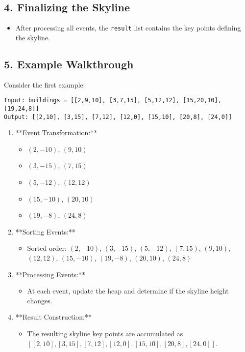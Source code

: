 \subsection*{4. Finalizing the Skyline}

\begin{itemize}
    \item After processing all events, the \texttt{result} list contains the key points defining the skyline.
\end{itemize}

\subsection*{5. Example Walkthrough}

Consider the first example:
\begin{verbatim}
Input: buildings = [[2,9,10], [3,7,15], [5,12,12], [15,20,10], [19,24,8]]
Output: [[2,10], [3,15], [7,12], [12,0], [15,10], [20,8], [24,0]]
\end{verbatim}

\begin{enumerate}
    \item **Event Transformation:**
    \begin{itemize}
        \item \((2, -10)\), \((9, 10)\)
        \item \((3, -15)\), \((7, 15)\)
        \item \((5, -12)\), \((12, 12)\)
        \item \((15, -10)\), \((20, 10)\)
        \item \((19, -8)\), \((24, 8)\)
    \end{itemize}
    
    \item **Sorting Events:**
    \begin{itemize}
        \item Sorted order: \((2, -10)\), \((3, -15)\), \((5, -12)\), \((7, 15)\), \((9, 10)\), \((12, 12)\), \((15, -10)\), \((19, -8)\), \((20, 10)\), \((24, 8)\)
    \end{itemize}
    
    \item **Processing Events:**
    \begin{itemize}
        \item At each event, update the heap and determine if the skyline height changes.
    \end{itemize}
    
    \item **Result Construction:**
    \begin{itemize}
        \item The resulting skyline key points are accumulated as \([[2,10], [3,15], [7,12], [12,0], [15,10], [20,8], [24,0]]\).
    \end{itemize}
\end{enumerate}

